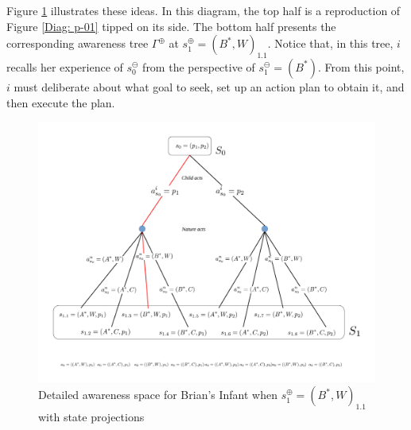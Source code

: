 \documentclass[
11pt,
titlepage,
reqno,
]{article}%
\theoremstyle{definition}
\begin{document}
	Figure \ref{Diag: p-02} illustrates these ideas. In this diagram, the top half is a reproduction of Figure \ref{Diag: p-01} tipped on its side. 
	The bottom half presents the corresponding awareness tree $\Gamma^\oplus$ at $s^\oplus_1=(B^\ast,W)_{1.1}$.
	Notice that, in this tree, $i$ recalls her experience of $s^\ominus_0$ from the perspective of $s^\ominus_1=(B^\ast)$.
	From this point, $i$ must deliberate about what goal to seek, set up an action plan to obtain it, and then execute the plan.
	
	\begin{figure}[h!]
		\centering
		\includegraphics*[page=2,trim = 0in 1in 0in 0in,scale=.6]{Awareness_Diagrams_All}
		\caption{Detailed awareness space for Brian's Infant when $s^\oplus_1=(B^\ast,W)_{1.1}$ with state projections\label{Diag: p-02}}%
	\end{figure}
	
\end{document}
